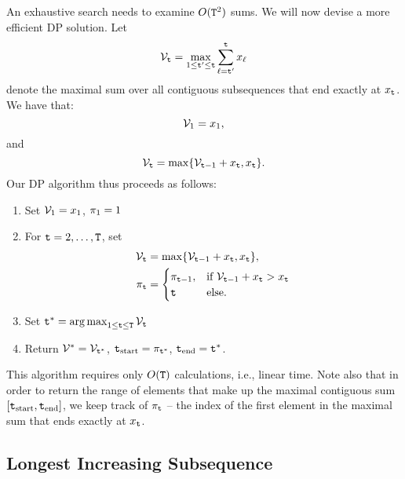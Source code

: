 An exhaustive search needs to examine $O({{\tt T}^2})$ sums. We will now devise a more efficient DP solution. Let 
\begin{equation*}
    {\mathcal{V}_{{\tt t}}} = \mathop {\max }\limits_{1 \le {\tt t}' \le {{\tt t}}} \sum\limits_{\ell  = {\tt t}'}^{{\tt t}} {{x_\ell }}
\end{equation*}
denote the maximal sum over all contiguous subsequences that end exactly at ${x_{{\tt t}}}$. We have that:
\begin{equation*}
    \mathcal{V}_1 = x_1,
\end{equation*}
and
\begin{equation*}
    \mathcal{V}_{{\tt t}} = \max \{\mathcal{V}_{{\tt t} - 1}+ x_{{\tt t}}, x_{{\tt t}} \}.
\end{equation*}
Our DP algorithm thus proceeds as follows:
\begin{enumerate}
    \item Set $\mathcal{V}_1 = x_1$, $\pi_1 = 1$
    \item For ${\tt t} = 2, \ldots, {\tt T}$, set
    \begin{equation*}
    \begin{split}
        \mathcal{V}_{{\tt t}} &= \max \{\mathcal{V}_{{\tt t} - 1}+ x_{{\tt t}}, x_{{\tt t}} \}, \\
        \pi_{{\tt t}} &= \begin{cases}
                                \pi_{{\tt t}-1}, & \text{if } \mathcal{V}_{{\tt t} - 1}+ x_{{\tt t}} > x_{{\tt t}} \\
                                {\tt t} & \text{else. } 
                              \end{cases}
    \end{split}
    \end{equation*}
    \item Set $\ttime^* = \argmax_{1 \leq \ttime \leq \tHorizon} \Value_{\ttime}$
    \item Return $\mathcal{V}^* = \mathcal{V}_{{\tt t}^*}$, ${\tt t}_{\text{start}}=\pi_{{\tt t}^*}$, ${\tt t}_{\text{end}}={\tt t}^*$.
\end{enumerate}
This algorithm requires only $O({\tt T})$ calculations, i.e., linear time. Note also that in order to return the range of elements that make up the maximal contiguous sum $[{\tt t}_{\text{start}},{\tt t}_{\text{end}}]$, we keep track of $\pi_{{\tt t}}$ -- the index of the first element in the maximal sum that ends exactly at ${x_{{\tt t}}}$. 

\subsection*{Longest Increasing Subsequence}

